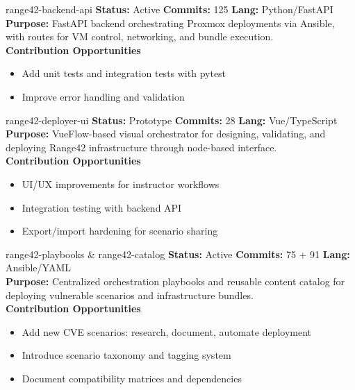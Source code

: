 \documentclass[aspectratio=169]{beamer}
\begin{document}
\begin{frame}{range42-backend-api \; \faProjectDiagram}
  \textbf{Status:} Active \hfill \textbf{Commits:} 125 \hfill \textbf{Lang:} Python/FastAPI\\[2mm]
  \textbf{Purpose:} FastAPI backend orchestrating Proxmox deployments via Ansible, with routes for VM control, networking, and bundle execution.\\[2mm]
  \textbf{Contribution Opportunities}
  \begin{itemize}
    \item Add unit tests and integration tests with pytest
    \item Improve error handling and validation
  \end{itemize}
\end{frame}

\begin{frame}{range42-deployer-ui \; \faDrawPolygon}
  \textbf{Status:} Prototype \hfill \textbf{Commits:} 28 \hfill \textbf{Lang:} Vue/TypeScript\\[2mm]
  \textbf{Purpose:} VueFlow-based visual orchestrator for designing, validating, and deploying Range42 infrastructure through node-based interface.\\[2mm]
  \textbf{Contribution Opportunities}
  \begin{itemize}
    \item UI/UX improvements for instructor workflows
    \item Integration testing with backend API
    \item Export/import hardening for scenario sharing
  \end{itemize}
\end{frame}

\begin{frame}{range42-playbooks \& range42-catalog \; \faCubes}
  \textbf{Status:} Active \hfill \textbf{Commits:} 75 + 91 \hfill \textbf{Lang:} Ansible/YAML\\[2mm]
  \textbf{Purpose:} Centralized orchestration playbooks and reusable content catalog for deploying vulnerable scenarios and infrastructure bundles.\\[2mm]
  \textbf{Contribution Opportunities}
  \begin{itemize}
    \item \alert{Add new CVE scenarios}: research, document, automate deployment
    \item Introduce scenario taxonomy and tagging system
    \item Document compatibility matrices and dependencies
  \end{itemize}
\end{frame}
\end{document}
